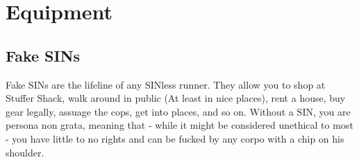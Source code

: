 \section{Equipment}

\subsection{Fake SINs}\label{fake_SINs}

Fake SINs are the lifeline of any SINless runner. They allow you to shop at Stuffer Shack, walk around in public (At least in nice places), rent a house, buy gear legally, assuage the cops, get into places, and so on. Without a SIN, you are persona non grata, meaning that - while it might be considered unethical to most - you have little to no rights and can be fucked by any corpo with a chip on his shoulder.

